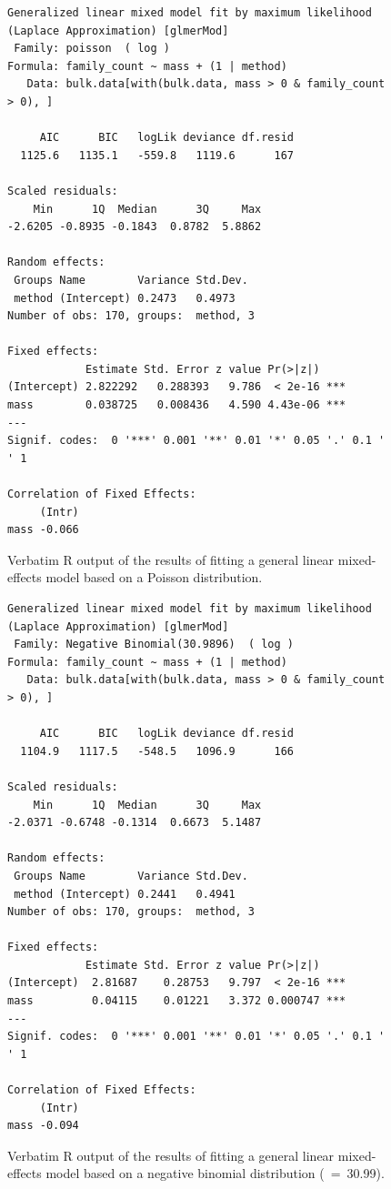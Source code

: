 \documentclass[10pt,letterpaper,twocolumn]{article}
\begin{document}
\begin{figure}[h]
	\lstset{numbers=left}
	\lstset{xleftmargin=5mm,framexleftmargin=5mm}
	\begin{lstlisting}
Generalized linear mixed model fit by maximum likelihood (Laplace Approximation) [glmerMod]
 Family: poisson  ( log )
Formula: family_count ~ mass + (1 | method)
   Data: bulk.data[with(bulk.data, mass > 0 & family_count > 0), ]

     AIC      BIC   logLik deviance df.resid 
  1125.6   1135.1   -559.8   1119.6      167 

Scaled residuals: 
    Min      1Q  Median      3Q     Max 
-2.6205 -0.8935 -0.1843  0.8782  5.8862 

Random effects:
 Groups Name        Variance Std.Dev.
 method (Intercept) 0.2473   0.4973  
Number of obs: 170, groups:  method, 3

Fixed effects:
            Estimate Std. Error z value Pr(>|z|)    
(Intercept) 2.822292   0.288393   9.786  < 2e-16 ***
mass        0.038725   0.008436   4.590 4.43e-06 ***
---
Signif. codes:  0 '***' 0.001 '**' 0.01 '*' 0.05 '.' 0.1 ' ' 1

Correlation of Fixed Effects:
     (Intr)
mass -0.066
	\end{lstlisting}
	\caption{Verbatim R output of the results of fitting a general linear mixed-effects model based on a Poisson distribution.}
	\label{fig:bulk_glmm_poisson}
	\smallskip
	\nointerlineskip
	\hrulefill
\end{figure}

\begin{figure}[h]
	\lstset{numbers=left}
	\lstset{xleftmargin=5mm,framexleftmargin=5mm}
	\begin{lstlisting}
Generalized linear mixed model fit by maximum likelihood (Laplace Approximation) [glmerMod]
 Family: Negative Binomial(30.9896)  ( log )
Formula: family_count ~ mass + (1 | method)
   Data: bulk.data[with(bulk.data, mass > 0 & family_count > 0), ]

     AIC      BIC   logLik deviance df.resid 
  1104.9   1117.5   -548.5   1096.9      166 

Scaled residuals: 
    Min      1Q  Median      3Q     Max 
-2.0371 -0.6748 -0.1314  0.6673  5.1487 

Random effects:
 Groups Name        Variance Std.Dev.
 method (Intercept) 0.2441   0.4941  
Number of obs: 170, groups:  method, 3

Fixed effects:
            Estimate Std. Error z value Pr(>|z|)    
(Intercept)  2.81687    0.28753   9.797  < 2e-16 ***
mass         0.04115    0.01221   3.372 0.000747 ***
---
Signif. codes:  0 '***' 0.001 '**' 0.01 '*' 0.05 '.' 0.1 ' ' 1

Correlation of Fixed Effects:
     (Intr)
mass -0.094
	\end{lstlisting}
	\caption{Verbatim R output of the results of fitting a general linear mixed-effects model based on a negative binomial distribution (\texttheta~=~30.99).}
	\label{fig:bulk_glmm_nb}
	\smallskip
	\nointerlineskip
	\hrulefill
\end{figure}
\end{document}
